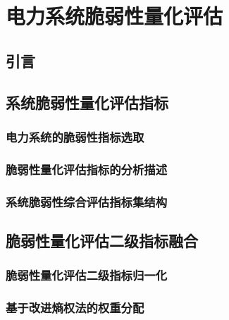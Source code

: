 \chapter{电力系统脆弱性量化评估}
\label{cha:quanti}

\section{引言}
\label{sec:index4}




\section{系统脆弱性量化评估指标}
\label{sec:describIndex}




\subsection{电力系统的脆弱性指标选取}
\label{sec:pickIndex}





\subsection{脆弱性量化评估指标的分析描述}
\label{sec:wordIndex}




\subsection{系统脆弱性综合评估指标集结构}
\label{sec:IndexSys}




\section{脆弱性量化评估二级指标融合}
\label{sec:processIndex}




\subsection{脆弱性量化评估二级指标归一化}
\label{sec:nomalzMethod}




\subsection{基于改进熵权法的权重分配}
\label{sec:nomalz}





